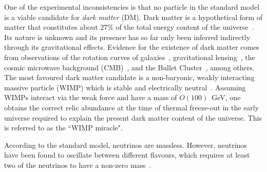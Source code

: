One of the experimental inconsistencies is that no particle in the standard 
model is a viable candidate for \textit{dark matter} (DM). Dark matter is a 
hypothetical form of matter that constitutes about 27\% of the total energy 
content of the universe~\cite{planck15}. Its nature is unknown and its presence 
has so far only been inferred indirectly through its gravitational effects. 
Evidence for the existence of dark matter comes from observations of the 
rotation curves of galaxies~\cite{zwicky37}, gravitational 
lensing~\cite{lensing90}, the cosmic microwave background 
(CMB)~\cite{planck15,wmap9}, and the Bullet Cluster~\cite{bullet06}, among 
others. 
The most favoured dark matter candidate is a non-baryonic, weakly interacting 
massive particle (WIMP) which is stable and electrically neutral~\cite{wimp}.
Assuming WIMPs interact via the weak force and have a mass of $O(100)$~GeV, one 
obtains the correct relic abundance at the time of thermal freeze-out in the 
early universe required to explain the present dark matter content of the 
universe. 
This is referred to as the ``WIMP miracle".

According to the standard model, neutrinos are massless. However, neutrinos 
have been found to oscillate between different flavours, which requires at 
least two of the neutrinos to have a non-zero 
mass~\cite{neutrino-osc1,neutrino-osc2}.

